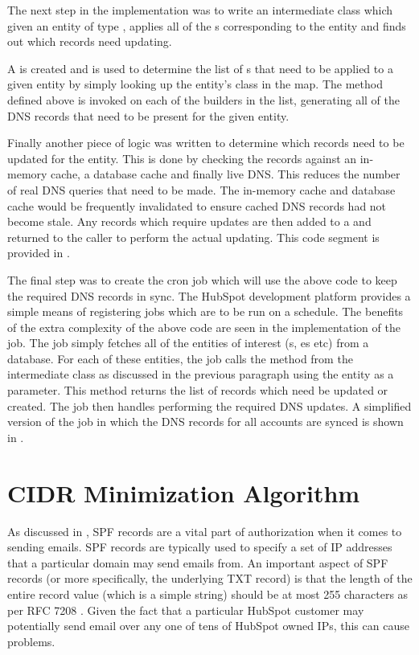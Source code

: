 The next step in the implementation was to write an intermediate class which given an entity of type , applies all of the s corresponding to the entity and finds out which records need updating. 

A  is created and is used to determine the list of s that need to be applied to a given entity by simply looking up the entity's class in the map. The  method defined above is invoked on each of the builders in the list, generating all of the DNS records that need to be present for the given entity. 

Finally another piece of logic was written to determine which records need to be updated for the entity. This is done by checking the records against an in-memory cache, a database cache and finally live DNS. This reduces the number of real DNS queries that need to be made. The in-memory cache and database cache would be frequently invalidated to ensure cached DNS records had not become stale. Any records which require updates are then added to a  and returned to the caller to perform the actual updating. This code segment is provided in  .

The final step was to create the cron job which will use the above code to keep the required DNS records in sync. The HubSpot development platform provides a simple means of registering jobs which are to be run on a schedule. The benefits of the extra complexity of the above code are seen in the implementation of the job. The job simply fetches all of the entities of interest (s, es etc) from a database. For each of these entities, the job calls the method from the intermediate class as discussed in the previous paragraph using the entity as a parameter. This method returns the list of records which need be updated or created. The job then handles performing the required DNS updates. A simplified version of the job in which the DNS records for all accounts are synced is shown in  .

\break
\section{CIDR Minimization Algorithm}
As discussed in , SPF records are a vital part of authorization when it comes to sending emails. SPF records are typically used to specify a set of IP addresses that a particular domain may send emails from. An important aspect of SPF records (or more specifically, the underlying TXT record) is that the length of the entire record value (which is a simple string) should be at most 255 characters as per RFC 7208 \cite{spfRFC}. Given the fact that a particular HubSpot customer may potentially send email over any one of tens of HubSpot owned IPs, this can cause problems. 

